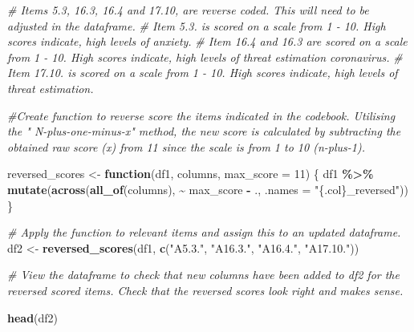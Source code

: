 \documentclass[
]{article}
\newenvironment{Shaded}{\begin{snugshade}}{\end{snugshade}}
\newcommand{\AttributeTok}[1]{\textcolor[rgb]{0.13,0.29,0.53}{#1}}
\newcommand{\CommentTok}[1]{\textcolor[rgb]{0.56,0.35,0.01}{\textit{#1}}}
\newcommand{\ControlFlowTok}[1]{\textcolor[rgb]{0.13,0.29,0.53}{\textbf{#1}}}
\newcommand{\DecValTok}[1]{\textcolor[rgb]{0.00,0.00,0.81}{#1}}
\newcommand{\FunctionTok}[1]{\textcolor[rgb]{0.13,0.29,0.53}{\textbf{#1}}}
\newcommand{\NormalTok}[1]{#1}
\newcommand{\OtherTok}[1]{\textcolor[rgb]{0.56,0.35,0.01}{#1}}
\newcommand{\SpecialCharTok}[1]{\textcolor[rgb]{0.81,0.36,0.00}{\textbf{#1}}}
\newcommand{\StringTok}[1]{\textcolor[rgb]{0.31,0.60,0.02}{#1}}
\begin{document}
\begin{Shaded}
\begin{Highlighting}[]
\CommentTok{\# Items 5.3, 16.3, 16.4 and 17.10, are reverse coded. This will need to be adjusted in the dataframe.}
\CommentTok{\# Item 5.3. is scored on a scale from 1 {-} 10. High scores indicate, high levels of anxiety.}
\CommentTok{\# Item 16.4 and 16.3 are scored on a scale from 1 {-} 10. High scores indicate, high levels of threat estimation coronavirus.}
\CommentTok{\# Item 17.10. is scored on a scale from 1 {-} 10. High scores indicate, high levels of threat estimation. }

\CommentTok{\#Create function to reverse score the items indicated in the codebook. Utilising the " N{-}plus{-}one{-}minus{-}x" method, the new score is calculated by subtracting the obtained raw score (x) from 11 since the scale is from 1 to 10 (n{-}plus{-}1). }

\NormalTok{reversed\_scores }\OtherTok{\textless{}{-}} \ControlFlowTok{function}\NormalTok{(df1, columns, }\AttributeTok{max\_score =} \DecValTok{11}\NormalTok{) \{}
\NormalTok{  df1 }\SpecialCharTok{\%\textgreater{}\%} 
    \FunctionTok{mutate}\NormalTok{(}\FunctionTok{across}\NormalTok{(}\FunctionTok{all\_of}\NormalTok{(columns), }\SpecialCharTok{\textasciitilde{}}\NormalTok{ max\_score }\SpecialCharTok{{-}}\NormalTok{ ., }\AttributeTok{.names =} \StringTok{"\{.col\}\_reversed"}\NormalTok{))}
\NormalTok{  \}}

\CommentTok{\# Apply the function to relevant items and assign this to an updated dataframe.}
\NormalTok{df2 }\OtherTok{\textless{}{-}} \FunctionTok{reversed\_scores}\NormalTok{(df1, }\FunctionTok{c}\NormalTok{(}\StringTok{"A5.3."}\NormalTok{, }\StringTok{"A16.3."}\NormalTok{, }\StringTok{"A16.4."}\NormalTok{, }\StringTok{"A17.10."}\NormalTok{))}


\CommentTok{\# View the dataframe to check that new columns have been added to df2 for the reversed scored items. Check that the reversed scores look right and makes sense. }

\FunctionTok{head}\NormalTok{(df2)}
\end{Highlighting}
\end{Shaded}
\end{document}
